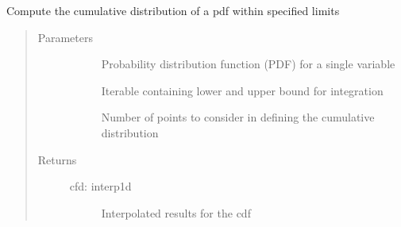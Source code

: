 \documentclass[letterpaper,10pt,english]{sphinxmanual}
\begin{document}
\begin{fulllineitems}
\label{\detokenize{stochprop.eofs:stochprop.eofs.build_cdf}}
\sphinxAtStartPar
Compute the cumulative distribution of a pdf within specified limits
\begin{quote}\begin{description}
\item[{Parameters}] \leavevmode\begin{description}
\item[{}] \leavevmode
\sphinxAtStartPar
Probability distribution function (PDF) for a single variable

\item[{}] \leavevmode
\sphinxAtStartPar
Iterable containing lower and upper bound for integration

\item[{}] \leavevmode
\sphinxAtStartPar
Number of points to consider in defining the cumulative distribution

\end{description}

\item[{Returns}] \leavevmode\begin{description}
\item[{cfd: interp1d}] \leavevmode
\sphinxAtStartPar
Interpolated results for the cdf

\end{description}

\end{description}\end{quote}

\end{fulllineitems}

\end{document}
